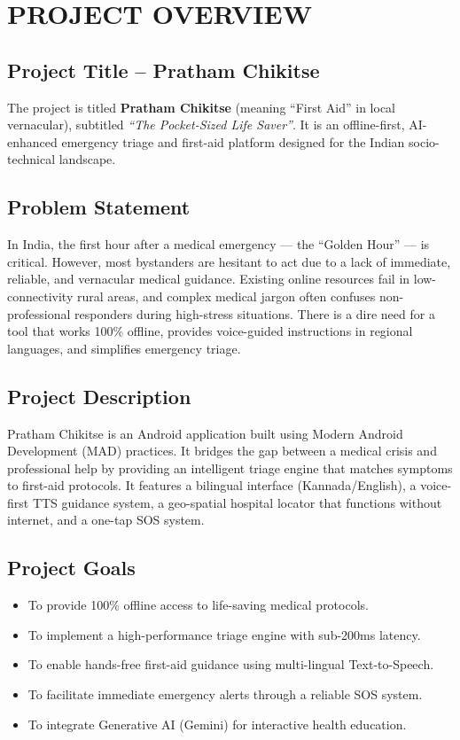 \documentclass[12pt,a4paper]{report}
\begin{document}
\newpage

\chapter{PROJECT OVERVIEW}

\section{Project Title -- Pratham Chikitse}
The project is titled \textbf{Pratham Chikitse} (meaning ``First Aid'' in local vernacular), subtitled \textit{``The Pocket-Sized Life Saver''}. It is an offline-first, AI-enhanced emergency triage and first-aid platform designed for the Indian socio-technical landscape.

\section{Problem Statement}
In India, the first hour after a medical emergency — the ``Golden Hour'' — is critical. However, most bystanders are hesitant to act due to a lack of immediate, reliable, and vernacular medical guidance. Existing online resources fail in low-connectivity rural areas, and complex medical jargon often confuses non-professional responders during high-stress situations. There is a dire need for a tool that works 100\% offline, provides voice-guided instructions in regional languages, and simplifies emergency triage.

\section{Project Description}
Pratham Chikitse is an Android application built using Modern Android Development (MAD) practices. It bridges the gap between a medical crisis and professional help by providing an intelligent triage engine that matches symptoms to first-aid protocols. It features a bilingual interface (Kannada/English), a voice-first TTS guidance system, a geo-spatial hospital locator that functions without internet, and a one-tap SOS system.

\section{Project Goals}
\begin{itemize}
    \item To provide 100\% offline access to life-saving medical protocols.
    \item To implement a high-performance triage engine with sub-200ms latency.
    \item To enable hands-free first-aid guidance using multi-lingual Text-to-Speech.
    \item To facilitate immediate emergency alerts through a reliable SOS system.
    \item To integrate Generative AI (Gemini) for interactive health education.
\end{itemize}
\end{document}
